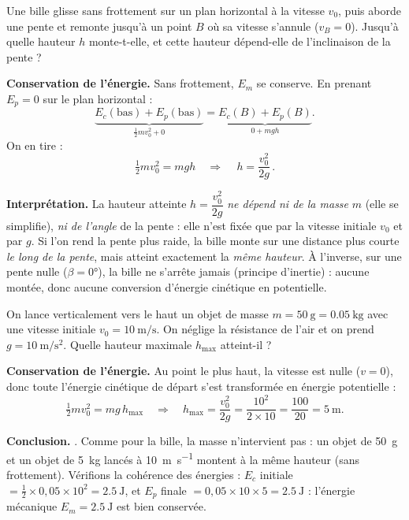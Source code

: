 \documentclass[11pt,a4paper]{article}
\begin{document}
\begin{exemple}
Une bille glisse sans frottement sur un plan horizontal à la vitesse $v_0$, puis aborde une pente et
remonte jusqu'à un point $B$ où sa vitesse s'annule ($v_B=0$). Jusqu'à quelle hauteur $h$ monte-t-elle,
et cette hauteur dépend-elle de l'inclinaison de la pente ?

\smallskip
\textbf{Conservation de l'énergie.} Sans frottement, $E_m$ se conserve. En prenant $E_p=0$ sur le
plan horizontal :
\[
\underbrace{E_c(\text{bas})+E_p(\text{bas})}_{\frac12 m v_0^2+0}
=\underbrace{E_c(B)+E_p(B)}_{0+mgh}.
\]
On en tire :
\[
\tfrac12 m v_0^2=mgh\quad\Longrightarrow\quad \boxed{\,h=\dfrac{v_0^2}{2g}\,}.
\]

\textbf{Interprétation.} La hauteur atteinte $h=\dfrac{v_0^2}{2g}$ \emph{ne dépend ni de la masse}
$m$ (elle se simplifie), \emph{ni de l'angle} de la pente : elle n'est fixée que par la vitesse
initiale $v_0$ et par $g$. Si l'on rend la pente plus raide, la bille monte sur une distance plus
courte \emph{le long de la pente}, mais atteint exactement la \emph{même hauteur}. À l'inverse, sur
une pente nulle ($\beta=\ang{0}$), la bille ne s'arrête jamais (principe d'inertie) : aucune montée,
donc aucune conversion d'énergie cinétique en potentielle.
\end{exemple}

\begin{exemple}
On lance verticalement vers le haut un objet de masse $m=\SI{50}{\gram}=\SI{0,05}{\kilogram}$ avec une
vitesse initiale $v_0=\SI{10}{\metre\per\second}$. On néglige la résistance de l'air et on prend
$g=\SI{10}{\metre\per\second\squared}$. Quelle hauteur maximale $h_{\max}$ atteint-il ?

\smallskip
\textbf{Conservation de l'énergie.} Au point le plus haut, la vitesse est nulle ($v=0$), donc toute
l'énergie cinétique de départ s'est transformée en énergie potentielle :
\[
\tfrac12 m v_0^2=mg\,h_{\max}\quad\Longrightarrow\quad h_{\max}=\frac{v_0^2}{2g}=\frac{10^2}{2\times10}=\frac{100}{20}=\SI{5}{\metre}.
\]

\textbf{Conclusion.} . Comme pour la bille, la masse n'intervient pas :
un objet de \SI{50}{\gram} et un objet de \SI{5}{\kilogram} lancés à \SI{10}{\metre\per\second}
montent à la même hauteur (sans frottement). Vérifions la cohérence des énergies :
$E_c$ initiale $=\tfrac12\times0{,}05\times10^2=\SI{2,5}{\joule}$, et
$E_p$ finale $=0{,}05\times10\times5=\SI{2,5}{\joule}$ : l'énergie mécanique
$E_m=\SI{2,5}{\joule}$ est bien conservée.
\end{exemple}
\end{document}
